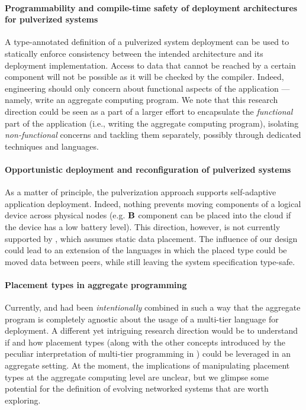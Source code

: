 \paragraph*{Programmability and compile-time safety of deployment architectures for pulverized systems}
%
A type-annotated definition of a pulverized system deployment can be used to statically enforce consistency between the intended architecture and its deployment implementation.
%
Access to data that cannot be reached by a certain component will not be possible as it will be checked by the compiler.
 Indeed, engineering should only concern about functional aspects of the application --- namely, write an aggregate computing program. 
 We note that this research direction could be seen as a part of a larger effort to encapsulate the \emph{functional} part of the application (i.e., writing the aggregate computing program),
 isolating \emph{non-functional} concerns and tackling them separately, possibly through dedicated techniques and languages.

\paragraph*{Opportunistic deployment and reconfiguration of pulverized systems}
As a matter of principle, the pulverization approach supports self-adaptive application deployment. 
  Indeed, nothing prevents moving components of a logical device across physical nodes (e.g. $\mathbf{B}$ component can be placed into the cloud if the device has a low battery level). 
  This direction, however, is not currently supported by \scalaloci{}, which assumes static data placement. 
  The influence of our design could lead to an extension of the languages in which the placed type could be moved data between peers, while still leaving the system specification type-safe.
 
\paragraph*{Placement types in aggregate programming} Currently, \scalaloci{} and \scafi{} had been \emph{intentionally} combined in such a way that the aggregate program is completely agnostic about the usage of a multi-tier language for deployment. 
A different yet intriguing research direction would be to understand if and how placement types 
  (along with the other concepts introduced by the peculiar interpretation of multi-tier programming in \scalaloci{})
  could be leveraged in an aggregate setting.
  At the moment, the implications of manipulating placement types at the aggregate computing level are unclear,
  but we glimpse some potential for the definition of evolving networked systems that are worth exploring.

